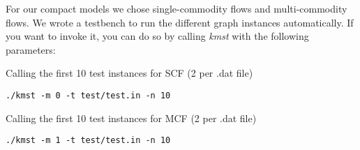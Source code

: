 \documentclass{article}
\begin{document}
\sloppy


\clearpage

For our compact models we chose single-commodity flows and multi-commodity flows. We wrote a testbench to run the different graph instances automatically. If you want to invoke it, you can do so by calling \textit{kmst} with the following parameters:

\hspace{0.5cm}

Calling the first 10 test instances for SCF (2 per .dat file)
\begin{lstlisting}
./kmst -m 0 -t test/test.in -n 10 
\end{lstlisting}

Calling the first 10 test instances for MCF (2 per .dat file)
\begin{lstlisting}
./kmst -m 1 -t test/test.in -n 10 
\end{lstlisting}







\clearpage
\end{document}
